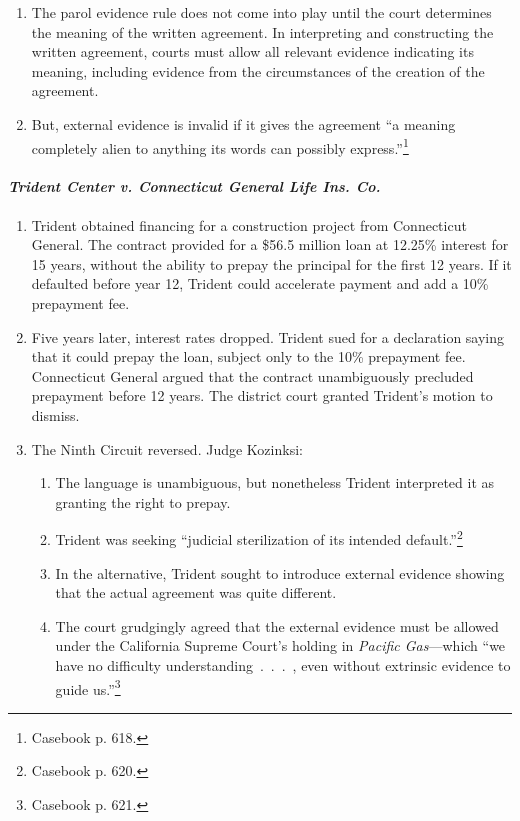 \begin{enumerate}
    \item The parol evidence rule does not come into play until the court 
    determines the meaning of the written agreement. In interpreting and 
    constructing the written agreement, courts must allow all relevant 
    evidence indicating its meaning, including evidence from the circumstances 
    of the creation of the agreement.
    \item But, external evidence is invalid if it gives the agreement ``a 
    meaning completely alien to anything its words can possibly 
    express.''\footnote{Casebook p. 618.}
\end{enumerate}

\paragraph{\emph{Trident Center v. Connecticut General Life Ins. Co.}}

\begin{enumerate}
    \item Trident obtained financing for a construction project from 
    Connecticut General. The contract provided for a \$56.5 million loan at 
    12.25\% interest for 15 years, without the ability to prepay the principal 
    for the first 12 years. If it defaulted before year 12, Trident could 
    accelerate payment and add a 10\% prepayment fee.
    \item Five years later, interest rates dropped. Trident sued for a 
    declaration saying that it could prepay the loan, subject only to the 10\% 
    prepayment fee. Connecticut General argued that the contract unambiguously 
    precluded prepayment before 12 years. The district court granted Trident's 
    motion to dismiss.
    \item The Ninth Circuit reversed. Judge Kozinksi:
    \begin{enumerate}
        \item The language is unambiguous, but nonetheless Trident interpreted 
        it as granting the right to prepay.
        \item Trident was seeking ``judicial sterilization of its intended 
        default.''\footnote{Casebook p. 620.}
        \item In the alternative, Trident sought to introduce external 
        evidence showing that the actual agreement was quite different.
        \item The court grudgingly agreed that the external evidence must be 
        allowed under the California Supreme Court's holding in \emph{Pacific 
        Gas}---which ``we have no difficulty understanding~.~.~.~, even 
        without extrinsic evidence to guide us.''\footnote{Casebook p. 621.}
    \end{enumerate}
\end{enumerate}
